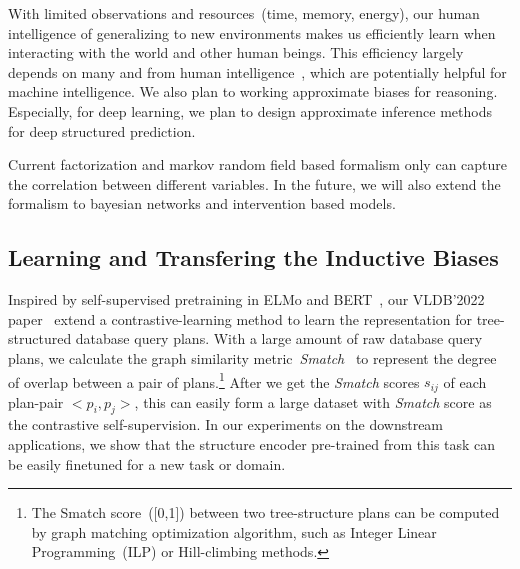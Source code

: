  With limited observations and
resources~(time, memory, energy), our human intelligence of
generalizing to new environments makes us efficiently learn when
interacting with the world and other human beings. This efficiency
largely depends on many  and  from human intelligence~\cite{Gershman2021WhatMU}, which are
potentially helpful for machine intelligence. We also plan to working
approximate biases for reasoning. Especially, for deep learning, we
plan to design approximate inference methods for deep structured
prediction.

 Current factorization and markov random field
based formalism only can capture the correlation between different
variables. In the future, we will also extend the formalism to
bayesian networks and intervention based models.

\subsection{Learning and Transfering the Inductive Biases}
\label{ssec:future:bias-learn-transfer}

Inspired by self-supervised pretraining in ELMo and
BERT~\cite{devlin2019bert}, our VLDB'2022
paper~\cite{paul2021database} extend a contrastive-learning method to
learn the representation for tree-structured database query
plans. With a large amount of raw database query plans, we calculate
the graph similarity metric~{\em Smatch}~\cite{Cai:2013wn} to
represent the degree of overlap between a pair of plans.\footnote{The
  Smatch score~([0,1]) between two tree-structure plans can be
  computed by graph matching optimization algorithm, such as Integer
  Linear Programming~(ILP) or Hill-climbing methods.}  After we get
the {\em Smatch} scores $s_{ij}$ of each plan-pair $<p_{i}, p_{j}>$,
this can easily form a large dataset with {\em Smatch} score as the
contrastive self-supervision. In our experiments on the downstream
applications, we show that the structure encoder pre-trained from this
task can be easily finetuned for a new task or domain.

